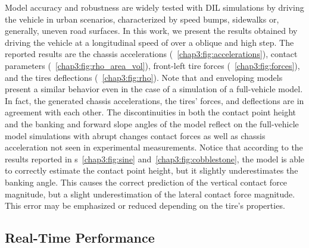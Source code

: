 Model accuracy and robustness are widely tested with DIL simulations by driving the vehicle in urban scenarios, characterized by speed bumps, sidewalks or, generally, uneven road surfaces. In this work, we present the results obtained by driving the vehicle at a longitudinal speed of  over a  oblique and  high step. The reported results are the chassis accelerations (\figurename{}~\ref{chap3:fig:accelerations}), contact parameters (\figurename{}~\ref{chap3:fig:rho_area_vol}), front-left tire forces (\figurename{}~\ref{chap3:fig:forces}), and the tires deflections (\figurename{}~\ref{chap3:fig:rho}). Note that \Enve{} and \Swift{} enveloping models present a similar behavior even in the case of a simulation of a full-vehicle model. In fact, the generated chassis accelerations, the tires' forces, and deflections are in agreement with each other. The discontinuities in both the contact point height and the banking and forward slope angles of the \TMEasy{} model reflect on the full-vehicle model simulations with abrupt changes contact forces as well as chassis acceleration not seen in experimental measurements. Notice that according to the results reported in \figurename{}s~\ref{chap3:fig:sine} and~\ref{chap3:fig:cobblestone}, the \Enve{} model is able to correctly estimate the contact point height, but it slightly underestimates the banking angle. This causes the correct prediction of the vertical contact force magnitude, but a slight underestimation of the lateral contact force magnitude. This error may be emphasized or reduced depending on the tire's properties.

\subsection{Real-Time Performance}
\label{chap3:Performance}

